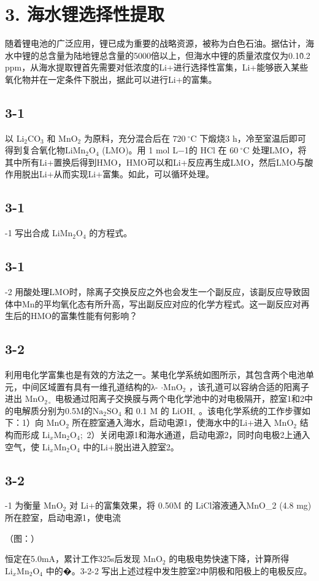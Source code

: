 \section*{3. 海水锂选择性提取}
随着锂电池的⼴泛应⽤，锂已成为重要的战略资源，被称为⽩⾊⽯油。据估计，海⽔中锂的总含量为陆地锂总含量的5000倍以上，但海⽔中锂的质量浓度仅为0.1\~0.2 ppm，从海⽔提取锂⾸先需要对低浓度的Li+进⾏选择性富集，Li+能够嵌⼊某些氧化物并在⼀定条件下脱出，据此可以进⾏Li+的富集。

\subsection*{3-1}
以 $\mathrm { L i _ { 2 } C O _ { 3 } }$ 和 $\mathrm { M n O _ { 2 } }$ 为原料，充分混合后在 $7 2 0 ~ ^ { \circ } \mathrm { C }$ 下煅烧3 h，冷⾄室温后即可得到复合氧化物$\mathrm { L i M n _ { 2 } O _ { 4 } }$ (LMO)。⽤ 1 mol L−1的 HCl 在 $6 0 ~ ^ { \circ } \mathrm { C }$ 处理LMO，将其中所有Li+置换后得到HMO，HMO可以和Li+反应再⽣成LMO，然后LMO与酸作⽤脱出Li+从⽽实现Li+富集。如此，可以循环处理。

\subsection*{3-1}
-1 写出合成 $\mathrm { L i M n _ { 2 } O _ { 4 } }$ 的⽅程式。

\subsection*{3-1}
-2 ⽤酸处理LMO时，除离⼦交换反应之外也会发⽣⼀个副反应，该副反应导致固体中Mn的平均氧化态有所升⾼，写出副反应对应的化学⽅程式。这⼀副反应对再⽣后的HMO的富集性能有何影响？

\subsection*{3-2}
利⽤电化学富集也是有效的⽅法之⼀。某电化学系统如图所⽰，其包含两个电池单元，中间区域置有具有⼀维孔道结构的λ- $\cdot \mathrm { M n O _ { 2 } }$ ，该孔道可以容纳合适的阳离⼦进出 $\mathrm { M n O } _ { 2 \circ }$ 电极通过阳离⼦交换膜与两个电化学池中的对电极隔开，腔室1和2中的电解质分别为0.5M的$\mathrm { N a } _ { 2 } \mathrm { S O } _ { 4 }$ 和 0.1 M 的 $\mathrm { L i O H _ { \circ } }$ 。该电化学系统的⼯作步骤如下：1）向 $\mathrm { M n O _ { 2 } }$ 所在腔室通⼊海⽔，启动电源1，使海⽔中的Li+进⼊ $\mathrm { M n O _ { 2 } }$ 结构⽽形成 $\mathrm { L i } _ { x } \mathrm { M n } _ { 2 } \mathrm { O } _ { 4 } ;$ 2）关闭电源1和海⽔通道，启动电源2，同时向电极2上通⼊空⽓，使 $\mathrm { L i } _ { x } \mathrm { M n } _ { 2 } \mathrm { O } _ { 4 }$ 中的Li+脱出进⼊腔室2。

\subsection*{3-2}
-1 为衡量 $\mathrm { M n O _ { 2 } }$ 对 Li+的富集效果，将 0.50M 的 LiCl溶液通⼊MnO_{2} (4.8 mg)所在腔室，启动电源1，使电流

（图：）

恒定在5.0mA，累计⼯作325s后发现 $\mathrm { M n O _ { 2 } }$ 的电极电势快速下降，计算所得 $\mathrm { L i } _ { x } \mathrm { M n } _ { 2 } \mathrm { O } _ { 4 }$ 中的�。3-2-2 写出上述过程中发⽣腔室2中阴极和阳极上的电极反应。
